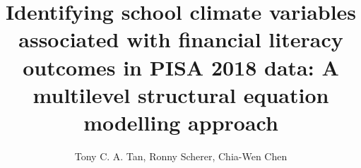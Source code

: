 \documentclass[review]{elsarticle}
\begin{document}
\begin{frontmatter}

\title{Identifying school climate variables associated with financial literacy outcomes in PISA 2018 data: A multilevel structural equation modelling approach}

\author{Tony C. A. Tan, Ronny Scherer, Chia-Wen Chen}
\address{Centre for Educational Measurement, University of Oslo}






\end{frontmatter}

\linenumbers












\end{document}
